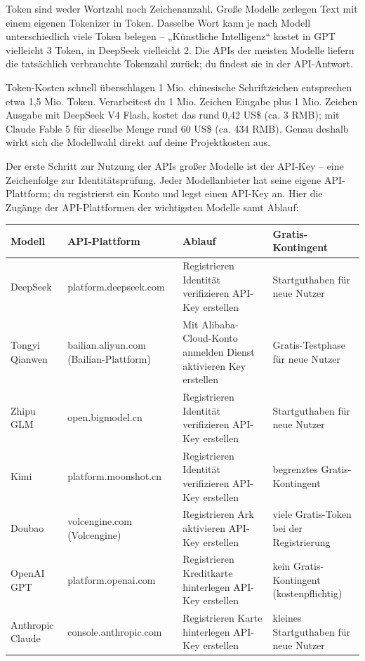 Token sind weder Wortzahl noch Zeichenanzahl. Große Modelle zerlegen Text mit einem eigenen Tokenizer in Token. Dasselbe Wort kann je nach Modell unterschiedlich viele Token belegen – „Künstliche Intelligenz“ kostet in GPT vielleicht 3 Token, in DeepSeek vielleicht 2. Die APIs der meisten Modelle liefern die tatsächlich verbrauchte Tokenzahl zurück; du findest sie in der API-Antwort.

\begin{tcbinfo}{Token-Kosten schnell überschlagen}
1 Mio. chinesische Schriftzeichen entsprechen etwa 1,5 Mio. Token. Verarbeitest du 1 Mio. Zeichen Eingabe plus 1 Mio. Zeichen Ausgabe mit DeepSeek V4 Flash, kostet das rund 0,42 US\$ (ca. 3 RMB); mit Claude Fable 5 für dieselbe Menge rund 60 US\$ (ca. 434 RMB). Genau deshalb wirkt sich die Modellwahl direkt auf deine Projektkosten aus.

\end{tcbinfo}


Der erste Schritt zur Nutzung der APIs großer Modelle ist der API-Key – eine Zeichenfolge zur Identitätsprüfung. Jeder Modellanbieter hat seine eigene API-Plattform; du registrierst ein Konto und legst einen API-Key an. Hier die Zugänge der API-Plattformen der wichtigsten Modelle samt Ablauf:

\begin{center}
\begin{tabularx}{\linewidth}{|X|X|X|X|}
\hline
\textbf{Modell} & \textbf{API-Plattform} & \textbf{Ablauf} & \textbf{Gratis-Kontingent} \tabularnewline
\hline
DeepSeek & platform.deepseek.com & Registrieren Identität verifizieren API-Key erstellen & Startguthaben für neue Nutzer \tabularnewline
Tongyi Qianwen & bailian.aliyun.com (Bailian-Plattform) & Mit Alibaba-Cloud-Konto anmelden Dienst aktivieren Key erstellen & Gratis-Testphase für neue Nutzer \tabularnewline
Zhipu GLM & open.bigmodel.cn & Registrieren Identität verifizieren API-Key erstellen & Startguthaben für neue Nutzer \tabularnewline
Kimi & platform.moonshot.cn & Registrieren Identität verifizieren API-Key erstellen & begrenztes Gratis-Kontingent \tabularnewline
Doubao & volcengine.com (Volcengine) & Registrieren Ark aktivieren API-Key erstellen & viele Gratis-Token bei der Registrierung \tabularnewline
OpenAI GPT & platform.openai.com & Registrieren Kreditkarte hinterlegen API-Key erstellen & kein Gratis-Kontingent (kostenpflichtig) \tabularnewline
Anthropic Claude & console.anthropic.com & Registrieren Karte hinterlegen API-Key erstellen & kleines Startguthaben für neue Nutzer \tabularnewline
\hline
\end{tabularx}
\end{center}

